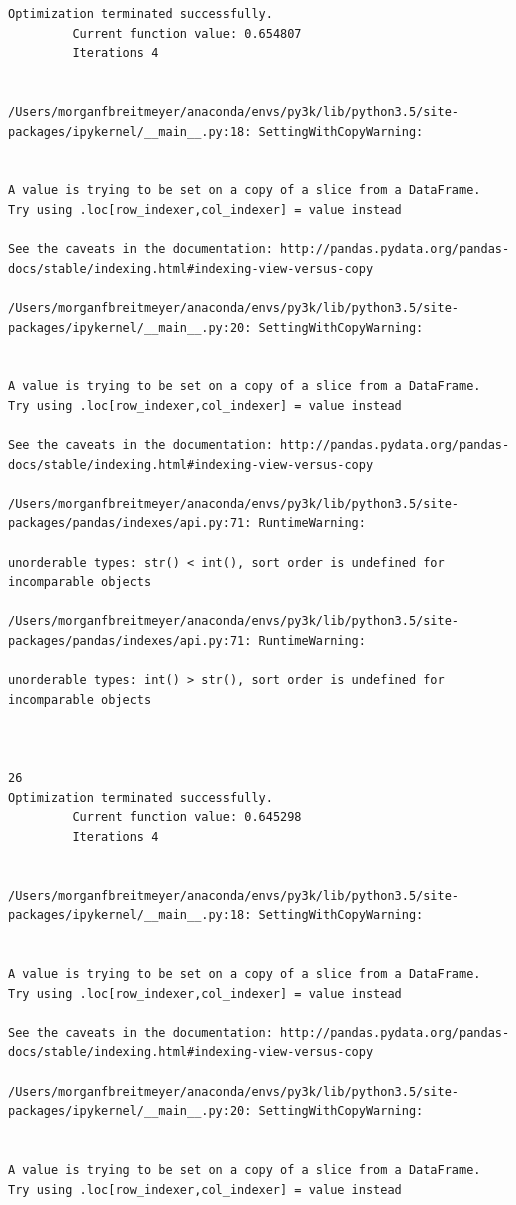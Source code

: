 \begin{lstlisting}
Optimization terminated successfully.
         Current function value: 0.654807
         Iterations 4


/Users/morganfbreitmeyer/anaconda/envs/py3k/lib/python3.5/site-packages/ipykernel/__main__.py:18: SettingWithCopyWarning:


A value is trying to be set on a copy of a slice from a DataFrame.
Try using .loc[row_indexer,col_indexer] = value instead

See the caveats in the documentation: http://pandas.pydata.org/pandas-docs/stable/indexing.html#indexing-view-versus-copy

/Users/morganfbreitmeyer/anaconda/envs/py3k/lib/python3.5/site-packages/ipykernel/__main__.py:20: SettingWithCopyWarning:


A value is trying to be set on a copy of a slice from a DataFrame.
Try using .loc[row_indexer,col_indexer] = value instead

See the caveats in the documentation: http://pandas.pydata.org/pandas-docs/stable/indexing.html#indexing-view-versus-copy

/Users/morganfbreitmeyer/anaconda/envs/py3k/lib/python3.5/site-packages/pandas/indexes/api.py:71: RuntimeWarning:

unorderable types: str() < int(), sort order is undefined for incomparable objects

/Users/morganfbreitmeyer/anaconda/envs/py3k/lib/python3.5/site-packages/pandas/indexes/api.py:71: RuntimeWarning:

unorderable types: int() > str(), sort order is undefined for incomparable objects



26
Optimization terminated successfully.
         Current function value: 0.645298
         Iterations 4


/Users/morganfbreitmeyer/anaconda/envs/py3k/lib/python3.5/site-packages/ipykernel/__main__.py:18: SettingWithCopyWarning:


A value is trying to be set on a copy of a slice from a DataFrame.
Try using .loc[row_indexer,col_indexer] = value instead

See the caveats in the documentation: http://pandas.pydata.org/pandas-docs/stable/indexing.html#indexing-view-versus-copy

/Users/morganfbreitmeyer/anaconda/envs/py3k/lib/python3.5/site-packages/ipykernel/__main__.py:20: SettingWithCopyWarning:


A value is trying to be set on a copy of a slice from a DataFrame.
Try using .loc[row_indexer,col_indexer] = value instead


\end{lstlisting}
